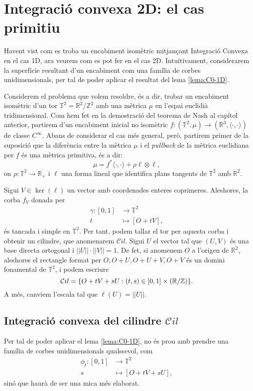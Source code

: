 \section{Integració convexa 2D: el cas primitiu}
Havent vist com es troba un encabiment isomètric mitjançant Integració Convexa en el cas 1D, ara veurem com es pot fer en el cas 2D. Intuitivament, considerarem la superfície resultant d'un encabiment com una família de corbes unidimensionals, per tal de poder aplicar el resultat del lema \ref{lema:C0-1D}.

Considerem el problema que volem resoldre, és a dir, trobar un encabiment isomètric d'un tor $\mathbb T^2 = \mathbb R^2/\mathbb Z^2$ amb una mètrica $\mu$ en l'espai euclidià tridimensional. Com hem fet en la demostració del teorema de Nash al capítol anterior, partirem d'un encabiment inicial no isomètric $f:(\mathbb T^2, \mu)\to(\mathbb R^3, \langle\cdot, \cdot\rangle)$ de classe $C^\infty$. Abans de considerar el cas més general, però, partirem primer de la suposició que la diferència entre la mètrica $\mu$ i el \textit{pullback} de la mètrica euclidiana per $f$ és una mètrica primitiva, és a dir:
\begin{equation}\label{eq:def primitiva}
    \mu = f^*\langle\cdot, \cdot\rangle + \rho \ell\otimes \ell,
\end{equation}
on $\rho:\mathbb T^2\to\mathbb R_+$ i $\ell$ una forma lineal que identifica plans tangents de $\mathbb T^2$ amb $\mathbb R^2$. 

Sigui $V\in\ker(\ell)$ un vector amb coordenades enteres coprimeres. Aleshores, la corba $f_V$ donada per 
\begin{align}
    \nonumber\gamma:[0,1]&\to\mathbb T^2\\
    \nonumber t&\mapsto [O+tV],
\end{align}
és tancada i simple en $\mathbb T^2$. Per tant, podem tallar el tor per aquesta corba i obtenir un cilindre, que anomenarem $\mathcal Cil$. Sigui $U$ el vector tal que $(U,V)$ és una base directa ortogonal i $||U||\cdot||V||=1$. De fet, si anomenem $O$ a l'origen de $\mathbb R^2$, aleshores el rectangle format per $O, O+U, O+U+V, O+V$ és un domini fonamental de $\mathbb T^2$, i podem escriure 
\begin{equation}
    \mathcal Cil = \{O+tV+sU : (t,s)\in[0,1]\times(\mathbb R / \mathbb Z)\}.
\end{equation}
A més, canviem l'escala tal que $\ell(U)=||U||$.

\subsection{Integració convexa del cilindre $\mathcal Cil$}
Per tal de poder aplicar el lema \ref{lema:C0-1D}, no és prou amb prendre una família de corbes unidimensionals qualssevol, com
\begin{align}
    \nonumber\phi_t:[0,1]&\to\mathbb T^2\\
    \nonumber s&\mapsto [O+tV+sU],
\end{align}
sinó que haurà de ser una mica més elaborat. 

